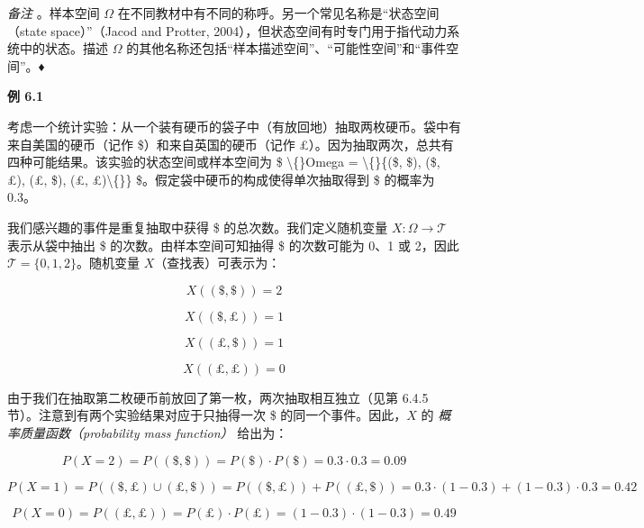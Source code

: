 \emph{备注} 。样本空间 $ \Omega $ 在不同教材中有不同的称呼。另一个常见名称是“状态空间（state space）”（Jacod and Protter, 2004），但状态空间有时专门用于指代动力系统中的状态。描述 $ \Omega $ 的其他名称还包括“样本描述空间”、“可能性空间”和“事件空间”。♦

\begin{notebox}
\textbf{例 6.1}
\end{notebox}

\begin{notebox}
考虑一个统计实验：从一个装有硬币的袋子中（有放回地）抽取两枚硬币。袋中有来自美国的硬币（记作 \$）和来自英国的硬币（记作 £）。因为抽取两次，总共有四种可能结果。该实验的状态空间或样本空间为 \$ \textbackslash\{\}Omega = \textbackslash\{\}\{(\$, \$), (\$, £), (£, \$), (£, £)\textbackslash\{\}\} \$。假定袋中硬币的构成使得单次抽取得到 \$ 的概率为 0.3。
\end{notebox}

\begin{notebox}
我们感兴趣的事件是重复抽取中获得 \$ 的总次数。我们定义随机变量 $ X : \Omega \to \mathcal{T} $ 表示从袋中抽出 \$ 的次数。由样本空间可知抽得 \$ 的次数可能为 0、1 或 2，因此 $ \mathcal{T} = \{0, 1, 2\} $。随机变量 $ X $（查找表）可表示为：

\begin{equation}
X((\$, \$)) = 2
\tag{6.1}\label{eq:6-1}
\end{equation}

\begin{equation}
X((\$, £)) = 1
\tag{6.2}\label{eq:6-2}
\end{equation}

\begin{equation}
X((£, \$)) = 1
\tag{6.3}\label{eq:6-3}
\end{equation}

\begin{equation}
X((£, £)) = 0
\tag{6.4}\label{eq:6-4}
\end{equation}

由于我们在抽取第二枚硬币前放回了第一枚，两次抽取相互独立（见第 6.4.5 节）。注意到有两个实验结果对应于只抽得一次 \$ 的同一个事件。因此，$ X $ 的 \emph{概率质量函数（probability mass function）} 给出为：

\begin{equation}
P(X = 2) = P((\$, \$)) = P(\$) \cdot P(\$) = 0.3 \cdot 0.3 = 0.09
\tag{6.5}\label{eq:6-5}
\end{equation}

\begin{equation}
P(X = 1) = P((\$, £) \cup (£, \$)) = P((\$, £)) + P((£, \$)) = 0.3 \cdot (1 - 0.3) + (1 - 0.3) \cdot 0.3 = 0.42
\tag{6.6}\label{eq:6-6}
\end{equation}

\begin{equation}
P(X = 0) = P((£, £)) = P(£) \cdot P(£) = (1 - 0.3) \cdot (1 - 0.3) = 0.49
\tag{6.7}\label{eq:6-7}
\end{equation}
\end{notebox}

